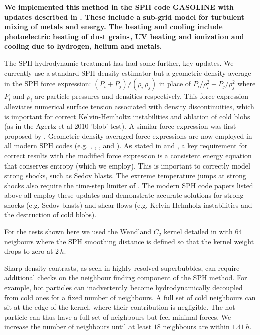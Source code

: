 {\bf We implemented this method in the SPH code {\sc GASOLINE}
\citep{Wadsley2004} with updates described in \cite{Shen2010}.  These
include a sub-grid model for turbulent mixing of metals and energy.  The
heating and cooling include photoelectric heating of dust grains, UV heating
and ionization and cooling due to hydrogen, helium and metals.

The SPH hydrodynamic treatment has had some further, key updates.  We currently
use a standard SPH density estimator but a  geometric density average in the SPH
force expression: $(P_i+P_j)/(\rho_i\,\rho_j)$ in place of
$P_i/\rho_i^2+P_j/\rho_j^2$ where $P_i$ and $\rho_i$ are particle pressures and
densities respectively. This force expression alleviates numerical surface
tension associated with density discontinuities, which is important for correct
Kelvin-Hemholtz instabilities and ablation of cold blobs (as in the Agertz et al
2010 'blob' test).  A similar force expression was first proposed by
\citet{Ritchie2001}.  Geometric density averaged force expressions are now
employed in all modern SPH codes (e.g. \cite{Hopkins2013}, \cite{Saitoh2013},
\cite{Kawata2013}, \cite{Hu2014} and \cite{Read2010}).  As
stated in \cite{Read2010} and \cite{Saitoh2013}, a key requirement
for correct results with the modified force expression is a consistent energy
equation that conserves entropy (which we employ).  This is important to
correctly model strong shocks, such as Sedov blasts.  The extreme temperature
jumps at strong shocks also require the time-step limiter of \citet{Saitoh2009}.
The modern SPH code papers listed above all employ these updates and demonstrate
accurate solutions for strong shocks (e.g. Sedov blasts) and shear flows (e.g.
Kelvin Helmholz instabilities and the destruction of cold blobs).

For the tests shown here we used the Wendland $C_2$ kernel detailed in
\citet{Dehnen2012} with 64 neigbours where the SPH smoothing distance is defined
so that the kernel weight drops to zero at $2\,h$.  

Sharp density contrasts, as seen in highly resolved superbubbles, can require
additional checks on the neighbour finding component of the SPH method.  For
example, hot particles can inadvertently become hydrodynamically decoupled from
cold ones for a fixed number of neighbours.  A full set of cold neighbours can
sit at the edge of the kernel, where their contribution is negligible.  The hot
particle can thus have a full set of neighbours but feel minimal forces.  We
increase the number of neighbours until at least $18$ neighbours are within
$1.41\,h$.  

}
